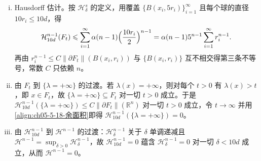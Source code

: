 \documentclass[../../main.tex]{subfiles}%
\begin{document}
\begin{remark}
\begin{enumerate}[(i)]
\item Hausdorff 估计。按 $\mathcal{H}^{s}_{\delta}$ 的定义，用覆盖 $\{B(x_i,5r_i)\}_{i=1}^{\infty}$ 且每个球的直径 $10r_i\leqslant10d$，得
\begin{align*}
\mathcal{H}^{n-1}_{10d}(F_t)\leqslant\sum_{i=1}^{\infty}\alpha(n-1)\Bigl(\frac{10r_i}{2}\Bigr)^{n-1}=\alpha(n-1)5^{n-1}\sum_{i=1}^{\infty}r_i^{n-1} .
\end{align*}
再由 $r_i^{n-1}\leqslant C\lVert\partial F_t\rVert(B(x_i,r_i))$ 与 $\{B(x_i,r_i)\}$ 互不相交得第三条不等号，常数 $C$ 只依赖 $n$。
\item 由 $F_t$ 到 $\{\lambda=+\infty\}$ 的过渡。若 $\lambda(x)=+\infty$，则对每个 $t>0$ 有 $\lambda(x)>t$，即 $x\in F_t$，故 $\{\lambda=+\infty\}\subseteq F_t$ 对一切 $t>0$ 成立。于是 $\mathcal{H}^{n-1}_{10d}(\{\lambda=+\infty\})\leqslant C\lVert\partial F_t\rVert(\mathbb{R}^n)$ 对一切 $t>0$ 成立，令 $t\to\infty$ 并用\eqref{align:ch05-5-18-余面积}即得 $\mathcal{H}^{n-1}_{10d}(\{\lambda=+\infty\})=0$。
\item 由 $\mathcal{H}^{n-1}_{10d}$ 到 $\mathcal{H}^{n-1}$ 的过渡：$\mathcal{H}^{n-1}_{\delta}$ 关于 $\delta$ 单调递减且 $\mathcal{H}^{n-1}=\sup_{\delta>0}\mathcal{H}^{n-1}_{\delta}$，故 $\mathcal{H}^{n-1}_{10d}=0$ 蕴含 $\mathcal{H}^{n-1}_{\delta}=0$ 对一切 $\delta<10d$ 成立，从而 $\mathcal{H}^{n-1}=0$。
\end{enumerate}
\end{remark}
\end{document}
